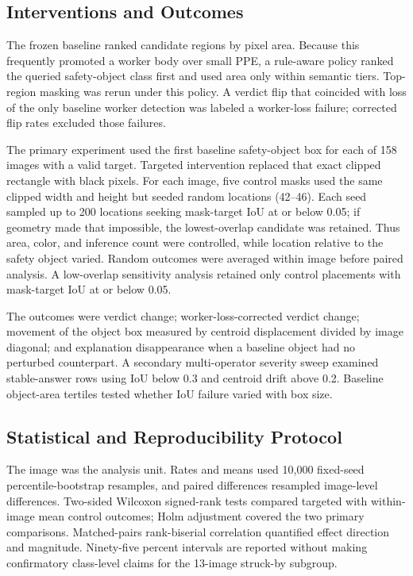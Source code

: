 \documentclass[12pt,letterpaper,twoside]{article}
\begin{document}
\subsection{Interventions and Outcomes}

The frozen baseline ranked candidate regions by pixel area. Because this frequently promoted a worker body over small PPE, a rule-aware policy ranked the queried safety-object class first and used area only within semantic tiers. Top-region masking was rerun under this policy. A verdict flip that coincided with loss of the only baseline worker detection was labeled a worker-loss failure; corrected flip rates excluded those failures.

The primary experiment used the first baseline safety-object box for each of 158 images with a valid target. Targeted intervention replaced that exact clipped rectangle with black pixels. For each image, five control masks used the same clipped width and height but seeded random locations (42--46). Each seed sampled up to 200 locations seeking mask-target IoU at or below 0.05; if geometry made that impossible, the lowest-overlap candidate was retained. Thus area, color, and inference count were controlled, while location relative to the safety object varied. Random outcomes were averaged within image before paired analysis. A low-overlap sensitivity analysis retained only control placements with mask-target IoU at or below 0.05.

The outcomes were verdict change; worker-loss-corrected verdict change; movement of the object box measured by centroid displacement divided by image diagonal; and explanation disappearance when a baseline object had no perturbed counterpart. A secondary multi-operator severity sweep examined stable-answer rows using IoU below 0.3 and centroid drift above 0.2. Baseline object-area tertiles tested whether IoU failure varied with box size.

\subsection{Statistical and Reproducibility Protocol}

The image was the analysis unit. Rates and means used 10,000 fixed-seed percentile-bootstrap resamples, and paired differences resampled image-level differences. Two-sided Wilcoxon signed-rank tests compared targeted with within-image mean control outcomes; Holm adjustment covered the two primary comparisons. Matched-pairs rank-biserial correlation quantified effect direction and magnitude. Ninety-five percent intervals are reported without making confirmatory class-level claims for the 13-image struck-by subgroup.
\end{document}
